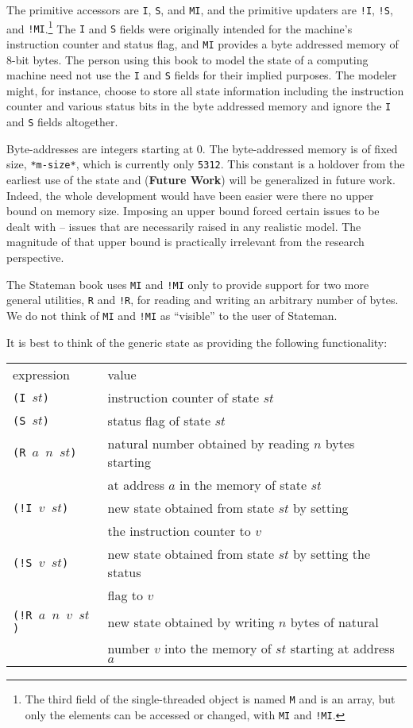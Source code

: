 \documentclass[submission,copyright,creativecommons]{eptcs}
\newcommand{\ptt}[1]{\tt{#1}}
\begin{document}
The primitive accessors are {\ptt{I}}, {\ptt{S}}, and {\ptt{MI}}, and the
primitive updaters are {\ptt{!I}}, {\ptt{!S}}, and {\ptt{!MI}}.\footnote{The third field of
the single-threaded object is named {\ptt{M}} and is an array, but only the elements can be
accessed or changed, with {\ptt{MI}} and {\ptt{!MI}}.}   The
{\ptt{I}} and {\ptt{S}} fields were originally intended for the machine's
instruction counter and status flag, and {\ptt{MI}} provides a byte addressed
memory of 8-bit bytes.  The person using this book to model the state of a
computing machine need not use the {\ptt{I}} and {\ptt{S}} fields for their
implied purposes.  The modeler might, for instance, choose to store all state
information including the instruction counter and various status bits in the
byte addressed memory and ignore the {\ptt{I}} and {\ptt{S}} fields
altogether.

Byte-addresses are integers starting at 0.  The byte-addressed memory is of
fixed size, {\ptt{*m-size*}}, which is currently only {\ptt{5312}}.  This
constant is a holdover from the earliest use of the state and ({\bf{Future
    Work}}) will be generalized in future work.  Indeed, the whole
development would have been easier were there no upper bound on memory size.  Imposing
an upper bound forced certain issues to be dealt with -- issues that are necessarily raised in
any realistic model.  The magnitude of that upper bound is practically irrelevant from
the research perspective.

The Stateman book uses {\ptt{MI}} and {\ptt{!MI}} only to provide support for
two more general utilities, {\ptt{R}} and {\ptt{!R}}, for reading and writing
an arbitrary number of bytes.  We do not think of {\ptt{MI}} and {\ptt{!MI}}
as ``visible'' to the user of Stateman.

It is best to think of the generic state as providing the following
functionality:

\begin{tabular}{ll}
expression &  value \\
{\ptt{(I $st$)}} &       instruction counter of state $st$\\
{\ptt{(S $st$)}} &      status flag of state $st$\\
{\ptt{(R $a$ $n$ $st$)}} & natural number obtained by reading $n$ bytes starting\\
                           & at address $a$ in the memory of state $st$\\
{\ptt{(!I $v$ $st$)}} &    new state obtained from state $st$ by setting\\
                      &    the instruction counter to $v$\\
{\ptt{(!S $v$ $st$)}} &    new state obtained from state $st$ by setting the status\\
                      &    flag to $v$\\
{\ptt{(!R $a$ $n$ $v$ $st$)}} & new state obtained by writing $n$ bytes of natural\\
                      & number $v$ into the memory of $st$ starting at address $a$\\
\end{tabular}
\end{document}
